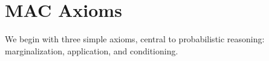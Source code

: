 \documentclass[dyna.tex]{subfiles}
\begin{document}
    \section{MAC Axioms}
    We begin with three simple axioms, central to probabilistic reasoning: marginalization, application, and conditioning.
\end{document}
